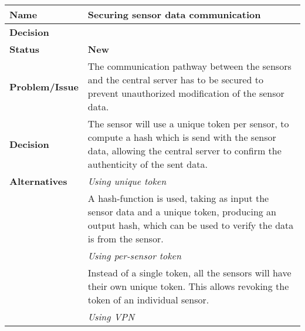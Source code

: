 \begin{table}[H]
	\begin{tabular}{L{0.2\textwidth} L{0.6\textwidth}}
		\textbf{Name}          & \textbf{Securing sensor data communication}                                                                                                                                    \\ \toprule
		\textbf{Decision}      &                                                                                                                                                                       \\ \midrule \midrule
		\textbf{Status}        & \textbf{New}                                                                                                                                                                   \\ \midrule
		\textbf{Problem/Issue} & The communication pathway between the sensors and the central server has to be secured to prevent unauthorized modification of the sensor data.                                \\ \midrule
		\textbf{Decision}      & The sensor will use a unique token per sensor, to compute a hash which is send with the sensor data, allowing the central server to confirm the authenticity of the sent data. \\ \midrule
		\textbf{Alternatives}  & \textit{Using unique token}                                                                                                                                                    \\
		                       & A hash-function is used, taking as input the sensor data and a unique token, producing an output hash, which can be used to verify the data is from the sensor.                \\
		                       & \textit{Using per-sensor token}                                                                                                                                                \\
		                       & Instead of a single token, all the sensors will have their own unique token. This allows revoking the token of an individual sensor.                                           \\
		                       & \textit{Using VPN}                                                                                                                                                             \\

\end{tabular}
\end{table}
